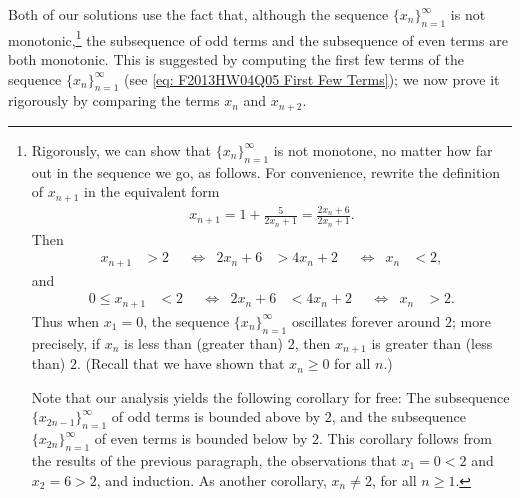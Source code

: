 Both of our solutions use the fact that, although the sequence $\{ x_{n} \}_{n=1}^{\infty}$ is not monotonic,\footnote{Rigorously, we can show that $\{ x_{n} \}_{n=1}^{\infty}$ is not monotone, no matter how far out in the sequence we go, as follows. For convenience, rewrite the definition of $x_{n+1}$ in the equivalent form
\begin{align*}
x_{n+1} = 1 + \frac{5}{2 x_{n} + 1} = \frac{2 x_{n} + 6}{2 x_{n} + 1}.
\end{align*}
Then
\begin{align*}
x_{n+1} &> 2
&
&\Leftrightarrow
&
2 x_{n} + 6 &> 4 x_{n} + 2
&
&\Leftrightarrow
&
x_{n} &< 2,
\end{align*}
and
\begin{align*}
0 \leq x_{n+1} &< 2
&
&\Leftrightarrow
&
2 x_{n} + 6 &< 4 x_{n} + 2
&
&\Leftrightarrow
&
x_{n} &> 2.
\end{align*}
Thus when $x_{1} = 0$, the sequence $\{ x_{n} \}_{n=1}^{\infty}$ oscillates forever around $2$; more precisely, if $x_{n}$ is less than (greater than) $2$, then $x_{n+1}$ is greater than (less than) $2$. (Recall that we have shown that $x_{n} \geq 0$ for all $n$.)

Note that our analysis yields the following corollary for free: The subsequence $\{ x_{2 n - 1} \}_{n=1}^{\infty}$ of odd terms is bounded above by $2$, and the subsequence $\{ x_{2 n} \}_{n=1}^{\infty}$ of even terms is bounded below by $2$. This corollary follows from the results of the previous paragraph, the observations that $x_{1} = 0 < 2$ and $x_{2} = 6 > 2$, and induction. As another corollary, $x_{n} \neq 2$, for all $n \geq 1$.} the subsequence of odd terms and the subsequence of even terms are both monotonic. This is suggested by computing the first few terms of the sequence $\{ x_{n} \}_{n=1}^{\infty}$ (see \eqref{eq: F2013HW04Q05 First Few Terms}); we now prove it rigorously by comparing the terms $x_{n}$ and $x_{n+2}$.

